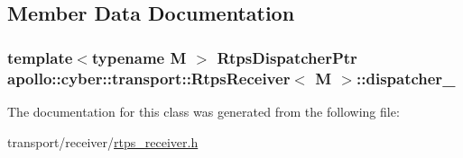 \subsection{Member Data Documentation}
\hypertarget{classapollo_1_1cyber_1_1transport_1_1RtpsReceiver_a3654dd1ba0a6abe3f34bd6c1803b80af}{
\subsubsection[{dispatcher\-\_\-}]{\setlength{\rightskip}{0pt plus 5cm}template$<$typename M $>$ {\bf Rtps\-Dispatcher\-Ptr} {\bf apollo\-::cyber\-::transport\-::\-Rtps\-Receiver}$<$ M $>$\-::dispatcher\-\_\-\hspace{0.3cm}{\ttfamily [private]}}}\label{classapollo_1_1cyber_1_1transport_1_1RtpsReceiver_a3654dd1ba0a6abe3f34bd6c1803b80af}


The documentation for this class was generated from the following file\-:\begin{DoxyCompactItemize}
\item 
transport/receiver/\hyperlink{rtps__receiver_8h}{rtps\-\_\-receiver.\-h}\end{DoxyCompactItemize}
